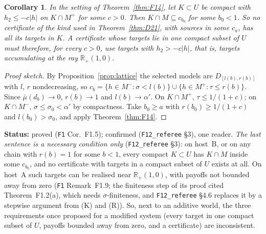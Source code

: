 \documentclass[11pt]{article}
\newtheorem{corollary}[theorem]{Corollary}
\theoremstyle{definition}
\theoremstyle{remark}
\newcommand{\R}{\mathbb R}
\newcommand{\src}[1]{\texttt{#1}}
\newcommand{\status}[1]{\par\smallskip\noindent\textbf{Status:} #1\par\smallskip}
\begin{document}
\begin{corollary}\label{cor:F15}
In the setting of Theorem~\ref{thm:F14}, let $K\subset U$ be compact with $h_2\le-c|h|$ on $K\cap M^+$ for some $c>0$. Then $K\cap M\subseteq c_{b_0}$ for some $b_0<1$. So no certificate of the kind used in Theorem~\ref{thm:D21}, with sources in some $c_a$, has all its targets in $K$. A certificate whose targets lie in one compact subset of $U$ must therefore, for every $c>0$, use targets with $h_2>-c|h|$, that is, targets accumulating at the ray $\R_+(1,0)$.
\end{corollary}
\begin{proof}[Proof sketch]
By Proposition~\ref{prop:lattice} the selected models are $D_{[l(b),r(b)]}$ with $l$, $r$ nondecreasing, so $c_b=\{h\in M^-:\sigma<l(b)\}\cup\{h\in M^+:\tau\le r(b)\}$. Since $\bar\mu(d_b)\to0$, $r(b)\to1$ and $l(b)\to\alpha'$. On $K\cap M^+$, $\tau\le1/(1+c)$; on $K\cap M^-$, $\sigma\le\sigma_0<\alpha'$ by compactness. Take $b_0\ge a$ with $r(b_0)\ge1/(1+c)$ and $l(b_0)>\sigma_0$, and apply Theorem~\ref{thm:F14}.
\end{proof}
\status{proved (\src{F1} Cor.~F1.5); confirmed (\src{F12\_referee} \S3), one reader. \emph{The last sentence is a necessary condition only} (\src{F12\_referee} \S3): on host~B, or on any chain with $r(b)=1$ for some $b<1$, every compact $K\subset U$ has $K\cap M$ inside some $c_{b_0}$, and no certificate with targets in a compact subset of $U$ exists at all. On host~A such targets can be realised near $\R_+(1,0)$, with payoffs not bounded away from zero (\src{F1} Remark~F1.9; the finiteness step of its proof cited Theorem~F1.2(a), which needs $\sigma$-finiteness, and \src{F12\_referee} \S4.6 replaces it by a stepwise argument from (K) and (R)). So, next to an additive world, the three requirements once proposed for a modified system (every target in one compact subset of $U$, payoffs bounded away from zero, and a certificate) are inconsistent.}
\end{document}
